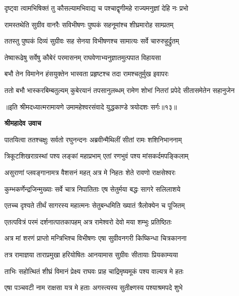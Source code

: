 \twolineshloka
{दृष्ट्वा त्वामभिषिक्तं तु कौसल्यामभिवाद्य च}
{पश्चाद्वृणीमहे राज्यमनुज्ञां देहि नः प्रभो} %

\twolineshloka
{रामस्तथेति सुग्रीव वानरैः सविभीषणः}
{पुष्पकं सहनूमांश्च शीघ्रमारोह साम्प्रतम्} %

\twolineshloka
{ततस्तु पुष्पकं दिव्यं सुग्रीवः सह सेनया}
{विभीषणश्च सामात्यः सर्वे चारुरुहुर्द्रुतम्} %

\twolineshloka
{तेष्वारूढेषु सर्वेषु कौबेरं परमासनम्}
{राघवेणाभ्यनुज्ञातमुत्पपात विहायसा} %

\twolineshloka
{बभौ तेन विमानेन हंसयुक्तेन भास्वता}
{प्रहृष्टश्च तदा रामश्चतुर्मुख इवापरः} %

\fourlineindentedshloka
{ततो बभौ भास्करबिम्बतुल्यम्}
{कुबेरयानं तपसानुलब्धम्}
{रामेण शोभां नितरां प्रपेदे}
{सीतासमेतेन सहानुजेन} %

{॥इति श्रीमदध्यात्मरामायणे उमामहेश्वरसंवादे युद्धकाण्डे
त्रयोदशः सर्गः॥१३॥
}




\textbf{श्रीमहादेव उवाच}

\twolineshloka
{पातयित्वा ततश्चक्षुः सर्वतो रघुनन्दनः}
{अब्रवीन्मैथिलीं सीतां रामः शशिनिभाननाम्} %

\twolineshloka
{त्रिकूटशिखराग्रस्थां पश्य लङ्कां महाप्रभाम्}
{एतां रणभुवं पश्य मांसकर्दमपङ्किलाम्} %

\twolineshloka
{असुराणां प्लवङ्गानामत्र वैशसनं महत्}
{अत्र मे निहतः शेते रावणो राक्षसेश्वरः} %

\twolineshloka
{कुम्भकर्णेन्द्रजिन्मुख्याः सर्वे चात्र निपातिताः}
{एष सेतुर्मया बद्धः सागरे सलिलाशये} %

\twolineshloka
{एतच्च दृश्यते तीर्थं सागरस्य महात्मनः}
{सेतुबन्धमिति ख्यातं त्रैलोक्येन च पूजितम्} %

\twolineshloka
{एतत्पवित्रं परमं दर्शनात्पातकापहम्}
{अत्र रामेश्वरो देवो मया शम्भुः प्रतिष्ठितः} %

\twolineshloka
{अत्र मां शरणं प्राप्तो मन्त्रिभिश्च विभीषणः}
{एषा सुग्रीवनगरी किष्किन्धा चित्रकानना} %

\twolineshloka
{तत्र रामाज्ञया ताराप्रमुखा हरियोषितः}
{आनयामास सुग्रीवः सीतायाः प्रियकाम्यया} %

\twolineshloka
{ताभिः सहोत्थितं शीघ्रं विमानं प्रेक्ष्य राघवः}
{प्राह चाद्रिमृष्यमूकं पश्य वाल्यत्र मे हतः} %

\twolineshloka
{एषा पञ्चवटी नाम राक्षसा यत्र मे हताः}
{अगस्त्यस्य सुतीक्ष्णस्य पश्याश्रमपदे शुभे} %

